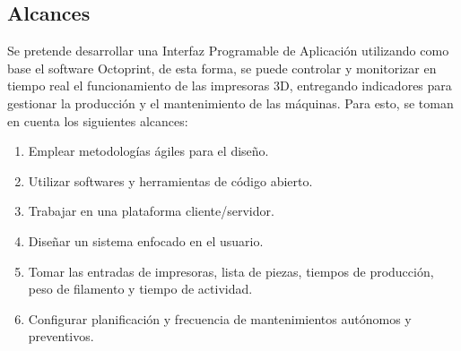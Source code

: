 \subsection{Alcances}

Se pretende desarrollar una Interfaz Programable de Aplicación utilizando como base el software Octoprint, de esta forma, se puede controlar y monitorizar en tiempo real el funcionamiento de las impresoras 3D, entregando indicadores para gestionar la producción y el mantenimiento de las máquinas. Para esto, se toman en cuenta los siguientes alcances:

\begin{enumerate}
	\item Emplear metodologías ágiles para el diseño.
	\item Utilizar softwares y herramientas de código abierto.
	\item Trabajar en una plataforma cliente/servidor.
	\item Diseñar un sistema enfocado en el usuario.
	\item Tomar las entradas de impresoras, lista de piezas, tiempos de producción, peso de filamento y tiempo de actividad. 
	\item Configurar planificación y frecuencia de mantenimientos autónomos y preventivos.
	
	


\end{enumerate}  

\


